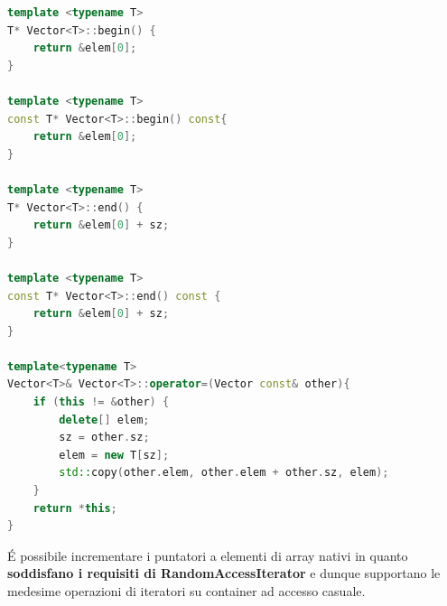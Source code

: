 \documentclass[10pt, oneside]{book}
\begin{document}
\begin{lstlisting}[language=C++]
template <typename T>
T* Vector<T>::begin() {
    return &elem[0];
}

template <typename T>
const T* Vector<T>::begin() const{
    return &elem[0];
}

template <typename T>
T* Vector<T>::end() {
    return &elem[0] + sz;
}

template <typename T>
const T* Vector<T>::end() const {
    return &elem[0] + sz;
}

template<typename T>
Vector<T>& Vector<T>::operator=(Vector const& other){
    if (this != &other) {
        delete[] elem;
        sz = other.sz;
        elem = new T[sz];
        std::copy(other.elem, other.elem + other.sz, elem);
    }
    return *this;
}
\end{lstlisting}
\'E possibile incrementare i puntatori a elementi di array nativi in quanto \textbf{soddisfano i requisiti di RandomAccessIterator} e dunque supportano le medesime operazioni di iteratori su container ad accesso casuale.
\end{document}
